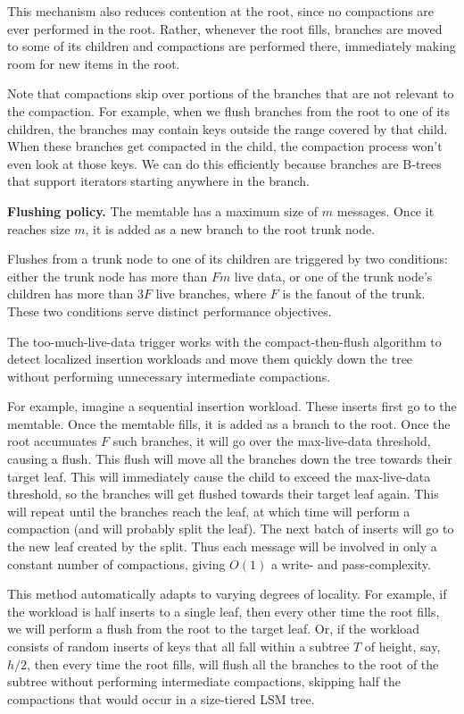 This mechanism also reduces contention at the root, since no
compactions are ever performed in the root.  Rather, whenever the root
fills, branches are moved to some of its children and compactions are
performed there, immediately making room for new items in the root.

Note that compactions skip over portions of the branches that are not
relevant to the compaction.  For example, when we flush branches from
the root to one of its children, the branches may contain keys outside
the range covered by that child.  When these branches get
compacted in the child, the compaction process won't
even look at those keys.  We can do this efficiently because branches
are B-trees that support iterators starting anywhere in the branch.

\textbf{Flushing policy.} 
The memtable has a maximum size of $m$ messages. 
Once it reaches size $m$, it is added as a
new branch to the root trunk node.

Flushes from a trunk node to one of its children are triggered by two
conditions: either the trunk node has more than $Fm$ live data, or one
of the trunk node's children has more than $3F$ live branches, where
$F$ is the fanout of the trunk.  These two conditions serve distinct
performance objectives.

The too-much-live-data trigger works with the compact-then-flush
algorithm to detect localized insertion workloads and move them
quickly down the tree without performing unnecessary intermediate
compactions.

For example, imagine a sequential insertion workload.  These inserts
first go to the memtable.  Once the memtable fills, it is added as a
branch to the root.  Once the root accumuates $F$ such branches, it
will go over the max-live-data threshold, causing a flush.  This flush
will move all the branches down the tree towards their target leaf.
This will immediately cause the child to exceed the max-live-data
threshold, so the branches will get flushed towards their target leaf
again.  This will repeat until the branches reach the leaf, at which
time \sysname will perform a compaction (and will probably split the
leaf).  The next batch of inserts will go to the new leaf created by
the split.  Thus each message will be involved in only a constant
number of compactions, giving $O(1)$ a write- and pass-complexity.

This method automatically adapts to varying degrees of
locality.  For example, if the workload is half inserts to a single
leaf, then every other time the root fills, we will perform a flush
from the root to the target leaf.  Or, if the workload consists of
random inserts of keys that all fall within a subtree $T$ of height,
say, $h/2$, then every time the root fills, \sysname will flush all
the branches to the root of the subtree without performing
intermediate compactions, skipping half the compactions that would
occur in a size-tiered LSM tree.


